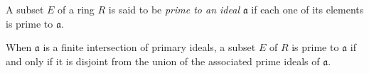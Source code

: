 A subset $E$ of a ring $R$ is said to be \emph{prime to an ideal} $\mathfrak{a}$ if each one of its elements is prime to $\mathfrak{a}$.

When $\mathfrak{a}$ is a finite intersection of primary ideals, a subset $E$ of $R$ is prime to $\mathfrak{a}$ if and only if it is disjoint from the union of the associated prime ideals of $\mathfrak{a}$.
